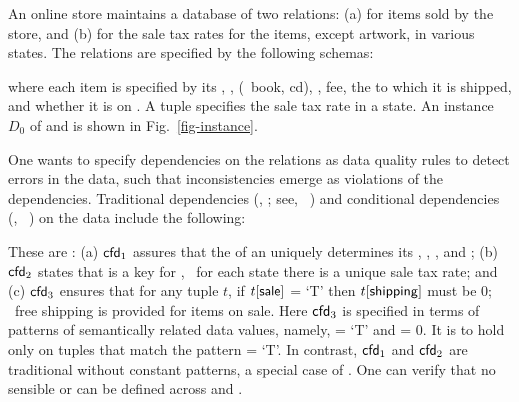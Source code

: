 \begin{example}
\label{exa-motivation}
An online store maintains a database of
two relations: (a)  for items sold
by the store, and (b)  for
the sale tax rates for the items, except artwork,
in various states.
The relations are specified by the following schemas:

\vspace{-.5ex}
 \vspace{-.5ex}




\noindent where
each item is specified by its , , 
(\eg~book, {\sc cd}), ,  fee,
the  to which it is shipped, and whether it
is on . A  tuple specifies the sale
tax rate in a state. An instance $D_0$ of  and  is shown
in Fig.~\ref{fig-instance}.

One wants to specify dependencies on the relations as data quality rules
to detect errors in the data, such that inconsistencies emerge as violations of
the dependencies. Traditional dependencies (\FDs, \INDs; see, \eg~\cite{AbHuVi1995})
and conditional dependencies (\CFDs, \CINDs~\cite{CFDs,tcs-CINDs})
on the data include the following:

\vspace{-0.5ex}  \vspace{-.5ex}

\noindent These are \CFDs: (a) ${\mathsf{cfd}}_1$ assures that the 
of an  uniquely determines its , ,
,  and ; (b) ${\mathsf{cfd}}_2$
states that  is a key for , \ie~for each state
there is a unique sale tax rate; and (c) ${\mathsf{cfd}}_3$ ensures
that for any  tuple $t$, if $t[\protect\mathsf{sale}]$ = `T' then
$t[\protect\mathsf{shipping}]$ must be $0$; \ie~free shipping is provided
for items on sale. Here ${\mathsf{cfd}}_3$ is specified in terms of
patterns of semantically related data values, namely,  =
`T' and  = 0. It is to hold only on  tuples that
match the pattern  = `T'. In contrast, ${\mathsf{cfd}}_1$
and ${\mathsf{cfd}}_2$ are traditional \FDs without constant patterns, a
special case of \CFDs. One  can verify that no sensible \INDs or
\CINDs can be defined across  and .


\end{example}
